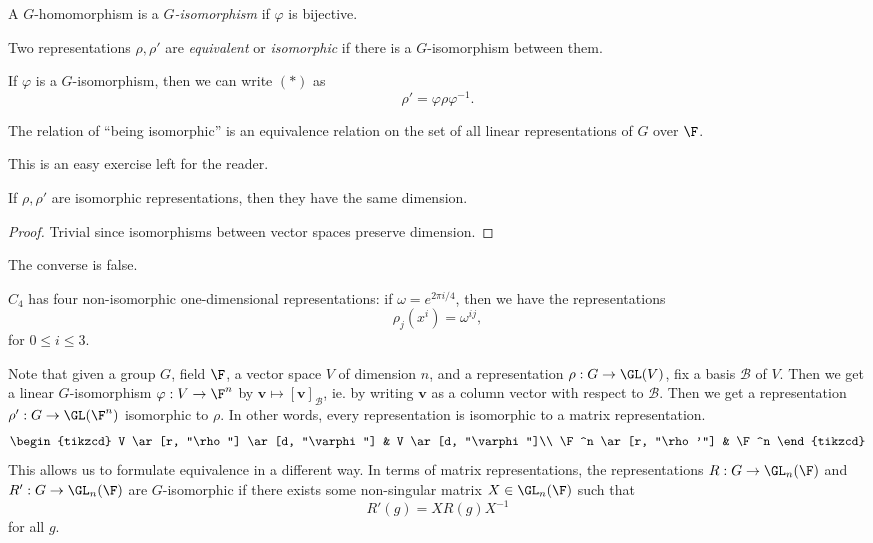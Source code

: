 \documentclass[a4paper]{article}
\begin{document}
\begin{defi}[$G$-isomorphism]
  A $G$-homomorphism is a \emph{$G$-isomorphism} if $\varphi$ is bijective.
\end{defi}

\begin{defi}
  Two representations $\rho, \rho'$ are \emph{equivalent} or \emph{isomorphic} if there is a $G$-isomorphism between them.
\end{defi}

If $\varphi$ is a $G$-isomorphism, then we can write $(*)$ as
\[
  \rho' = \varphi \rho \varphi^{-1}.\tag{$\dagger$}
\]
\begin{lemma}
  The relation of ``being isomorphic'' is an equivalence relation on the set of all linear representations of $G$ over $\F$.
\end{lemma}
This is an easy exercise left for the reader.

\begin{lemma}
  If $\rho, \rho'$ are isomorphic representations, then they have the same dimension.
\end{lemma}

\begin{proof}
  Trivial since isomorphisms between vector spaces preserve dimension.
\end{proof}

The converse is false.
\begin{eg}
  $C_4$ has four non-isomorphic one-dimensional representations: if $\omega = e^{2 \pi i/4}$, then we have the representations
  \[
    \rho_j (x^i) = \omega^{ij},
  \]
  for $0 \leq i \leq 3$.
\end{eg}
Note that given a group $G$, field $\F$, a vector space $V$ of dimension $n$, and a representation $\rho: G \to \GL(V)$, fix a basis $\mathcal{B}$ of $V$. Then we get a linear $G$-isomorphism $\varphi: V \to \F^n$ by $\mathbf{v} \mapsto [\mathbf{v}]_{\mathcal{B}}$, ie. by writing $\mathbf{v}$ as a column vector with respect to $\mathcal{B}$. Then we get a representation $\rho': G \to \GL(\F^n)$ isomorphic to $\rho$. In other words, every representation is isomorphic to a matrix representation.
\[
  \begin{tikzcd}
    V \ar[r, "\rho"] \ar[d, "\varphi"] & V \ar[d, "\varphi"]\\
    \F^n \ar[r, "\rho'"] & \F^n
  \end{tikzcd}
\]
This allows us to formulate equivalence in a different way. In terms of matrix representations, the representations $R: G \to \GL_n(\F)$ and $R': G \to \GL_n(\F)$ are $G$-isomorphic if there exists some non-singular matrix $X \in \GL_n(\F)$ such that
\[
  R'(g) = X R(g) X^{-1}
\]
for all $g$.
\end{document}
